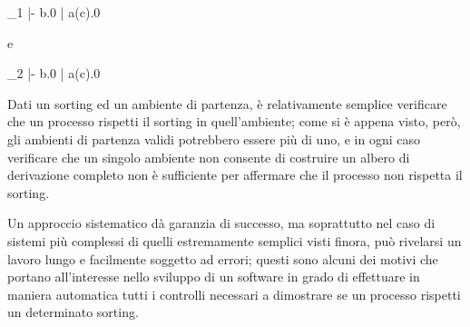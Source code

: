 \begin{pilisting}
  {\Psi_1 |- \langle b\rangle.0 \; | \; a(c).0}
\end{pilisting}

e

\begin{pilisting}
  {\Psi_2 |- \langle b\rangle.0 \; | \; a(c).0}
\end{pilisting}

Dati un sorting ed un ambiente di partenza, \`e relativamente semplice
verificare che un processo rispetti il sorting in quell'ambiente; come
si \`e appena visto, per\`o, gli ambienti di partenza validi potrebbero
essere pi\`u di uno, e in ogni caso verificare che un singolo ambiente
non consente di costruire un albero di derivazione completo non \`e
sufficiente per affermare che il processo non rispetta il sorting.

Un approccio sistematico d\`a garanzia di successo, ma soprattutto nel
caso di sistemi pi\`u complessi di quelli estremamente semplici visti
finora, pu\`o rivelarsi un lavoro lungo e facilmente soggetto ad
errori; questi sono alcuni dei motivi che portano all'interesse nello
sviluppo di un software in grado di effettuare in maniera automatica
tutti i controlli necessari a dimostrare se un processo rispetti un
determinato sorting.
